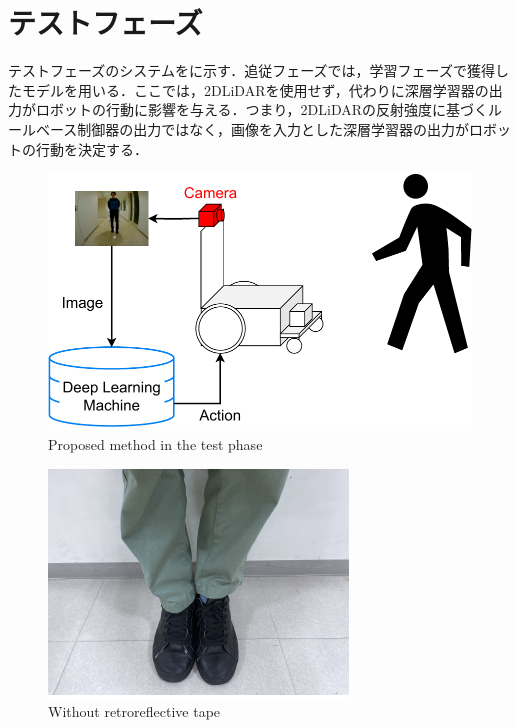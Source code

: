 
\section{テストフェーズ}

  テストフェーズのシステムをに示す．追従フェーズでは，学習フェーズで獲得したモデルを用いる．ここでは，2DLiDARを使用せず，代わりに深層学習器の出力がロボットの行動に影響を与える．つまり，2DLiDARの反射強度に基づくルールベース制御器の出力ではなく，画像を入力とした深層学習器の出力がロボットの行動を決定する．

  \vspace{0.5cm}

  \begin{figure}[h]
    \centering
    \includegraphics[keepaspectratio, scale=0.45] {images/pdf/RobotGuidance_test_system}
    \captionsetup{justification=raggedright} %
    \caption{Proposed method in the test phase}
    \label{Fig:RobotGuidance_following_system}
  \end{figure}

  \vspace{0.5cm}

  \begin{figure}[h]
    \centering
    \includegraphics[keepaspectratio, scale=0.55] {images/pdf/RobotGuidance_test_phase_leg}
    \captionsetup{justification=raggedright} %
    \caption{Without retroreflective tape}
    \label{Fig:RobotGuidance_following_phase_leg}
  \end{figure}

\newpage
